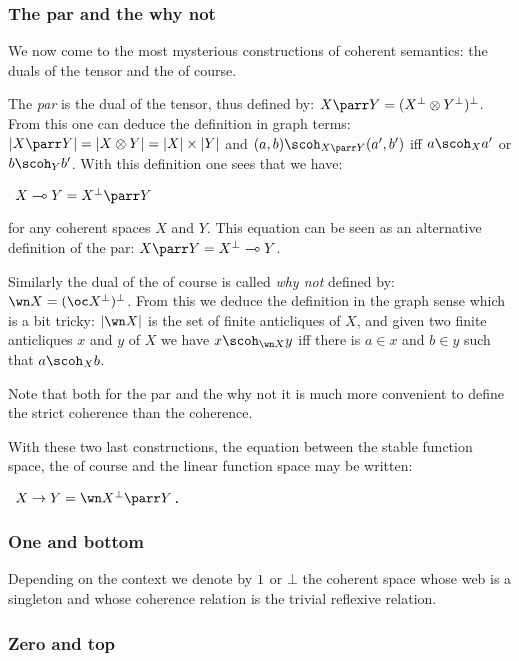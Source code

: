 \subsubsection{The par and the why not}\label{the-par-and-the-why-not}

We now come to the most mysterious constructions of coherent semantics:
the duals of the tensor and the of course.

The \emph{par} is the dual of the tensor, thus defined by:
\(X\parr Y = (X\orth\tens Y\orth)\orth\). From this one can deduce the
definition in graph terms:
\(\web{X\parr Y} = \web{X\tens Y} = \web X\times \web Y\) and
\((a,b)\scoh_{X\parr Y} (a',b')\) iff \(a\scoh_X a'\) or
\(b\scoh_Y b'\). With this definition one sees that we have:

\texttt{~}\(X\limp Y = X\orth\parr Y\)

for any coherent spaces \(X\) and \(Y\). This equation can be seen as an
alternative definition of the par: \(X\parr Y = X\orth\limp Y\).

Similarly the dual of the of course is called \emph{why not} defined by:
\(\wn X = (\oc X\orth)\orth\). From this we deduce the definition in the
graph sense which is a bit tricky: \(\web{\wn X}\) is the set of finite
anticliques of \(X\), and given two finite anticliques \(x\) and \(y\)
of \(X\) we have \(x\scoh_{\wn X} y\) iff there is \(a\in x\) and
\(b\in y\) such that \(a\scoh_X b\).

Note that both for the par and the why not it is much more convenient to
define the strict coherence than the coherence.

With these two last constructions, the equation between the stable
function space, the of course and the linear function space may be
written:

\texttt{~}\(X\imp Y = \wn X\orth\parr Y\)\texttt{.}

\subsubsection{One and bottom}\label{one-and-bottom}

Depending on the context we denote by \(1\) or \(\bot\) the coherent
space whose web is a singleton and whose coherence relation is the
trivial reflexive relation.

\subsubsection{Zero and top}\label{zero-and-top}

